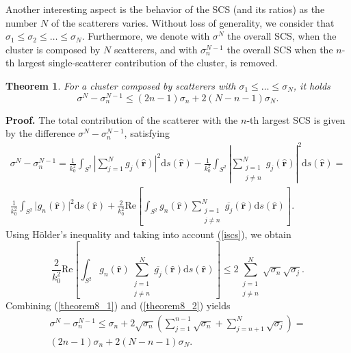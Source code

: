 \documentclass{article}
\newtheorem{theorem}{Theorem}
\begin{document}
Another interesting aspect is the behavior of the SCS (and its ratios) as the number $N$ of the scatterers varies. Without loss of generality, we consider that $\sigma_1\leq\sigma_2\leq\ldots\leq\sigma_N$. 
Furthermore, we denote with $\sigma^{N}$ the overall SCS, when the cluster is composed by $N$ scatterers, and with $\sigma_n^{N-1}$ the overall SCS when the $n$-th largest single-scatterer contribution of the cluster, is removed.
%
\begin{theorem}\label{theorem6}
    For a cluster composed by scatterers with $\sigma_1\leq\ldots\leq\sigma_N$, it holds
    \begin{equation}
        \label{theorem8_00}
        \sigma^{N}-
\sigma_n^{N-1}\leq(2n-1)\sigma_n+2(N-n-1)\sigma_N.
    \end{equation}
\end{theorem}
\textbf{Proof.}
%
The total contribution of the scatterer with the $n$-th largest SCS is given by the difference $\sigma^{N}-\sigma_n^{N-1}$, satisfying
%
\begin{align}
\nonumber
\sigma^{N}-\sigma_n^{N-1}=\frac{1}{k_0^2}\int_{S^2}\left\lvert \sum_{j=1}^{N}g_j(\hat{\mathbf{r}})\right\rvert^2\mathrm{d}s(\hat{\mathbf{r}})-
\frac{1}{k_0^2}\int_{S^2}\left\lvert \sum_{\substack{j=1\\j\ne n}}^{N}g_j(\hat{\mathbf{r}})\right\rvert^2\mathrm{d}s(\hat{\mathbf{r}})=\\\frac{1}{k_0^2}\int_{S^2}\lvert g_n(\hat{\mathbf{r}})\rvert^2\mathrm{d}s(\hat{\mathbf{r}})+\frac{2}{k_0^2}\mathrm{Re}\left[\int_{S^2} g_n(\hat{\mathbf{r}})\sum_{\substack{j=1\\j\ne n}}^{N}\overline{g_j}(\hat{\mathbf{r}})\mathrm{d}s(\hat{\mathbf{r}})\right].
\label{theorem8_1}
\end{align}
%
Using H\"older's inequality and taking into account (\ref{iscs}), we obtain
%
\begin{equation}\label{theorem8_2}
\frac{2}{k_0^2}\mathrm{Re}\left[\int_{S^2} g_n(\hat{\mathbf{r}})\sum_{\substack{j=1\\j\ne n}}^{N}\overline{g_j}(\hat{\mathbf{r}})\mathrm{d}s(\hat{\mathbf{r}})\right]\leq2\sum_{\substack{j=1\\j\ne n}}^{N}\sqrt{\sigma_n}\sqrt{\sigma_j}.%
\end{equation}
%
Combining (\ref{theorem8_1}) and (\ref{theorem8_2}) yields
%
\begin{align}
\nonumber
\sigma^{N}-
\sigma_n^{N-1}\leq\sigma_{n}+2\sqrt{\sigma_n}\left(\sum_{j=1}^{n-1}\sqrt{\sigma_n}+\sum_{j=n+1}^{N}\sqrt{\sigma_j}\right)=\\(2n-1)\sigma_n+2(N-n-1)\sigma_N.\label{theorem8_3}
\end{align}
\end{document}

